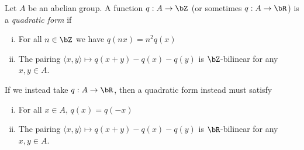 \begin{defn}\label{defn:quadratic-form}
	Let $A$ be an abelian group. A function $q:A\to \bZ$ (or sometimes $q:A\to \bR$) is a \emph{quadratic form} if
    \begin{enumerate}[(i)]
		\item For all $n \in \bZ$ we have $q(nx) = n^2q(x)$
		\item The pairing $\langle x,y\rangle \mapsto q(x+y)-q(x)-q(y)$ is $\bZ$-bilinear for any $x,y \in A$.
    \end{enumerate}
	If we instead take  $q:A\to \bR$, then a quadratic form instead must satisfy
	\begin{enumerate}[(i)]
		\item For all $x \in A$, $q(x) = q(-x)$ 
		\item The pairing $\langle x,y\rangle \mapsto q(x+y)-q(x)-q(y)$ is $\bR$-bilinear for any $x,y \in A$.
	\end{enumerate}
\end{defn}








